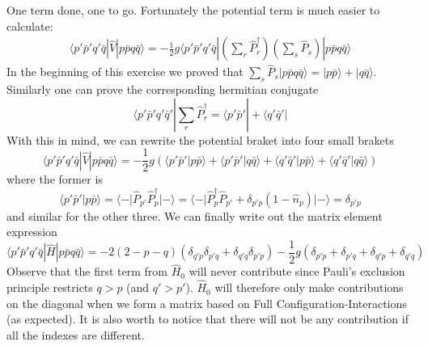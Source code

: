 \documentclass[norsk,a4paper,12pt]{article}
\begin{document}
One term done, one to go. Fortunately the potential term is much easier to calculate:
\begin{align*}
\langle p'\bar{p}'q'\bar{q}|\hat{V}|p\bar{p}q\bar{q}\rangle=-\frac{1}{2}g\langle p'\bar{p}'q'\bar{q}|(\sum_r\hat{P}_r^{\dagger})(\sum_s\hat{P}_s)|p\bar{p}q\bar{q}\rangle
\end{align*}
In the beginning of this exercise we proved that $\sum_s\hat{P}_s|p\bar{p}q\bar{q}\rangle=|p\bar{p}\rangle+|q\bar{q}\rangle$. Similarly one can prove the corresponding hermitian conjugate
\begin{equation}
\langle p'\bar{p}'q'\bar{q}'|\sum_r\hat{P}_r^{\dagger}=\langle p'\bar{p}'|+\langle q'\bar{q}'|
\end{equation}
With this in mind, we can rewrite the potential braket into four small brakets
\begin{equation}
\langle p'\bar{p}'q'\bar{q}|\hat{V}|p\bar{p}q\bar{q}\rangle=-\frac{1}{2}g(\langle p'\bar{p}'|p\bar{p}\rangle+\langle p'\bar{p}'|q\bar{q}\rangle+\langle q'\bar{q}'|p\bar{p}\rangle+\langle q'\bar{q}'|q\bar{q}\rangle)
\end{equation}
where the former is
\begin{equation}
\langle p'\bar{p}'|p\bar{p}\rangle=\langle -|\hat{P}_{p'}\hat{P}_p^{\dagger}|-\rangle=\langle -|\hat{P}_{p}^{\dagger}\hat{P}_{p'}+\delta_{p'p}(1-\hat{n}_p)|-\rangle=\delta_{p'p}
\end{equation}
and similar for the other three. We can finally write out the matrix element expression
\begin{equation}
\langle p'\bar{p}'q'\bar{q}|\hat{H}|p\bar{p}q\bar{q}\rangle=-2(2-p-q)(\delta_{q'p}\delta_{p'q}+\delta_{q'q}\delta_{p'p})-\frac{1}{2}g(\delta_{p'p}+\delta_{p'q}+\delta_{q'p}+\delta_{q'q})
\end{equation}
Observe that the first term from $\hat{H}_0$ will never contribute since Pauli's exclusion principle restricts $q>p$ (and $q'>p'$). $\hat{H}_0$ will therefore only make contributions on the diagonal when we form a matrix based on Full Configuration-Interactions (as expected). It is also worth to notice that there will not be any contribution if all the indexes are different.
\end{document}

